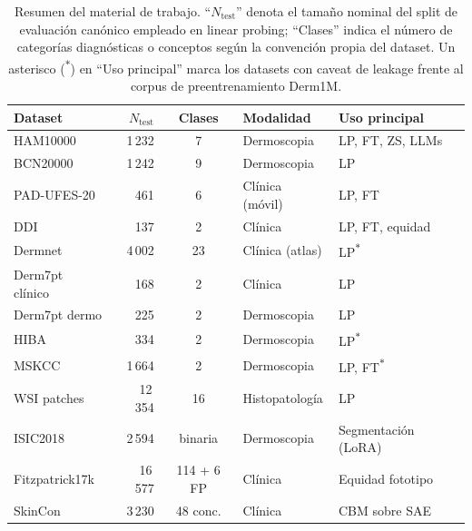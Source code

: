 \begin{table}[H]
\centering
\footnotesize
\setlength{\tabcolsep}{4pt}
\renewcommand{\arraystretch}{0.95}
\caption{Resumen del material de trabajo. ``$N_{\mathrm{test}}$''
denota el tamaño nominal del split de evaluación canónico empleado en
linear probing; ``Clases'' indica el número de categorías
diagnósticas o conceptos según la convención propia del dataset.
Un asterisco (\textsuperscript{$\ast$}) en ``Uso principal'' marca
los datasets con caveat de leakage frente al corpus de
preentrenamiento Derm1M.}
\label{tab:datasets-resumen}
\begin{tabular}{lrcll}
\hline
Dataset & $N_{\mathrm{test}}$ & Clases & Modalidad & Uso principal \\
\hline
HAM10000~\cite{ham10000}             & 1\,232  & 7          & Dermoscopia      & LP, FT, ZS, LLMs \\
BCN20000~\cite{bcn20000}             & 1\,242  & 9          & Dermoscopia      & LP \\
PAD-UFES-20~\cite{padufes}           & 461     & 6          & Clínica (móvil)  & LP, FT \\
DDI~\cite{ddi}                       & 137     & 2          & Clínica          & LP, FT, equidad \\
Dermnet~\cite{dermnet}               & 4\,002  & 23         & Clínica (atlas)  & LP\textsuperscript{$\ast$} \\
Derm7pt clínico~\cite{kawahara2019}  & 168     & 2          & Clínica          & LP \\
Derm7pt dermo~\cite{kawahara2019}    & 225     & 2          & Dermoscopia      & LP \\
HIBA                                 & 334     & 2          & Dermoscopia      & LP\textsuperscript{$\ast$} \\
MSKCC                                & 1\,664  & 2          & Dermoscopia      & LP, FT\textsuperscript{$\ast$} \\
WSI patches                          & 12\,354 & 16         & Histopatología   & LP \\
ISIC2018~\cite{isic2018}             & 2\,594  & binaria    & Dermoscopia      & Segmentación (LoRA) \\
Fitzpatrick17k~\cite{fitzpatrick17k} & 16\,577 & 114 + 6 FP & Clínica          & Equidad fototipo \\
SkinCon~\cite{skincon}               & 3\,230  & 48 conc.   & Clínica          & CBM sobre SAE \\
\hline
\end{tabular}
\end{table}

